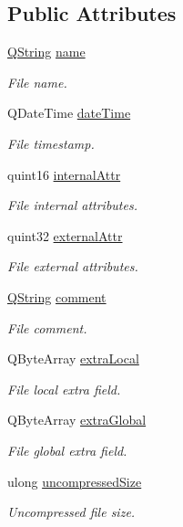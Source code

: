 \subsection*{Public Attributes}
\begin{DoxyCompactItemize}
\item 
\hyperlink{group___u_a_v_objects_plugin_gab9d252f49c333c94a72f97ce3105a32d}{Q\-String} \hyperlink{struct_qua_zip_new_info_a2bdef01b6ac3326e48598e32bfa5fbe8}{name}
\begin{DoxyCompactList}\small\item\em File name. \end{DoxyCompactList}\item 
Q\-Date\-Time \hyperlink{struct_qua_zip_new_info_aec7f3ac72c72a2e10b82ad64c2fa3453}{date\-Time}
\begin{DoxyCompactList}\small\item\em File timestamp. \end{DoxyCompactList}\item 
quint16 \hyperlink{struct_qua_zip_new_info_a59ce9776c2ac7547ade8cb4c404c77ab}{internal\-Attr}
\begin{DoxyCompactList}\small\item\em File internal attributes. \end{DoxyCompactList}\item 
quint32 \hyperlink{struct_qua_zip_new_info_affd1a9700d302e1395bd04f0864da7d0}{external\-Attr}
\begin{DoxyCompactList}\small\item\em File external attributes. \end{DoxyCompactList}\item 
\hyperlink{group___u_a_v_objects_plugin_gab9d252f49c333c94a72f97ce3105a32d}{Q\-String} \hyperlink{struct_qua_zip_new_info_ae24b1d38c3550b4724862ffcf8f20924}{comment}
\begin{DoxyCompactList}\small\item\em File comment. \end{DoxyCompactList}\item 
Q\-Byte\-Array \hyperlink{struct_qua_zip_new_info_ab377a81c51cf495c7aeee4f19340a43f}{extra\-Local}
\begin{DoxyCompactList}\small\item\em File local extra field. \end{DoxyCompactList}\item 
Q\-Byte\-Array \hyperlink{struct_qua_zip_new_info_abda207eb3949db3a88761c1b06e6bd58}{extra\-Global}
\begin{DoxyCompactList}\small\item\em File global extra field. \end{DoxyCompactList}\item 
ulong \hyperlink{struct_qua_zip_new_info_a18c079b3f2f5ab6eecdd61d6dbe93be6}{uncompressed\-Size}
\begin{DoxyCompactList}\small\item\em Uncompressed file size. \end{DoxyCompactList}\end{DoxyCompactItemize}


